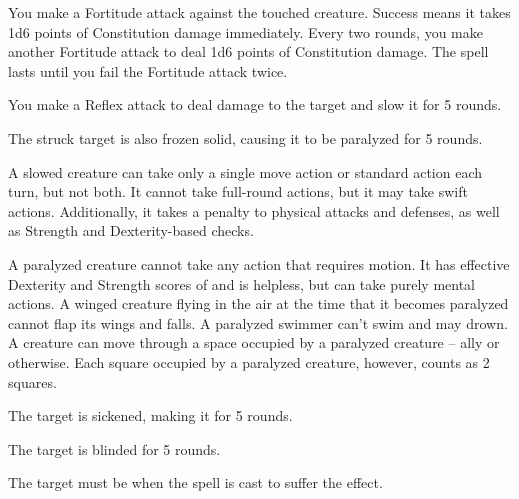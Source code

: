 \spelleffect You make a Fortitude attack against the touched creature. Success means it takes 1d6 points of Constitution damage immediately. Every two rounds, you make another Fortitude attack to deal 1d6 points of Constitution damage. The spell lasts until you fail the Fortitude attack twice.

\begin{spellhealthy}
    You make a Reflex attack to deal damage to the target and slow it for 5 rounds.
\end{spellhealthy}
\begin{spellblood}
    The struck target is also frozen solid, causing it to be paralyzed for 5 rounds.
\end{spellblood}
\spellnotes A slowed creature can take only a single move action or standard action each turn, but not both. It cannot take full-round actions, but it may take swift actions. Additionally, it takes a  penalty to physical attacks and defenses, as well as Strength and Dexterity-based checks.

A paralyzed creature cannot take any action that requires motion. It has effective Dexterity and Strength scores of  and is helpless, but can take purely mental actions. A winged creature flying in the air at the time that it becomes paralyzed cannot flap its wings and falls. A paralyzed swimmer can't swim and may drown. A creature can move through a space occupied by a paralyzed creature -- ally or otherwise. Each square occupied by a paralyzed creature, however, counts as 2 squares.

\begin{spellhealthy}
    The target is sickened, making it \vulnerable for 5 rounds.
\end{spellhealthy}
\begin{spellblood}
    The target is blinded for 5 rounds.
\end{spellblood}
\spellnotes The target must be \bloodied when the spell is cast to suffer the \bloodied effect.

